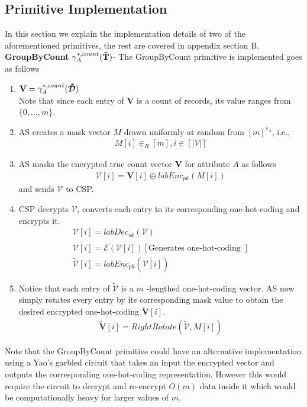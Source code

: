\subsection{Primitive Implementation}
In this section we explain the implementation details of two of the aforementioned \system primitives, the rest are covered in appendix section B.\\ \textbf{\textsf{GroupByCount }}$\gamma^{*,count}_A(\mathbf{\tilde{T}})$- The \textsf{GroupByCount} primitive is implemented  goes as follows   \begin{enumerate}[label=\alph*)]\item $\mathbf{V}=\gamma^{*,count}_{A}(\boldsymbol{\tilde{\mathcal{D}}})$ \\
 Note that since each entry of $\mathbf{V}$ is a count of records, its value ranges from $\{0,...,m\}$. \item \textsf{AS} creates a mask vector $M$ drawn uniformly at random from $[m]^{s_A}$, i.e.,  \begin{gather*} M[i] \in_R [m], i \in [|V|]\end{gather*} \item \textsf{AS} masks the encrypted true count vector $\mathbf{V}$ for attribute $A$ as follows \begin{gather*}\boldsymbol{\mathcal{V}}[i]= \mathbf{V}[i] \oplus labEnc_{pk}(M[i])\end{gather*} and sends $\boldsymbol{\mathcal{V}}$ to \textsf{CSP}.\item \textsf{CSP} decrypts $\boldsymbol{\mathcal{V}}$, converts each entry to its corresponding one-hot-coding and encrypts it. \begin{gather*}\mathcal{V}[i]=labDec_{sk}(\boldsymbol{\mathcal{V}})\\\tilde{\mathcal{V}[i]}=\mathcal{E}(\mathcal{V}[i])[\text{Generates one-hot-coding  }]\\\boldsymbol{\tilde{\mathcal{V}}}[i]=labEnc_{pk}(\tilde{\mathcal{V}[i]})\end{gather*}\item Notice that each entry of $\boldsymbol{\tilde{\mathcal{V}}}$ is a $m$ -lengthed one-hot-coding vector. \textsf{AS} now simply rotates every entry by its corresponding mask value to obtain the desired  encrypted one-hot-coding $\boldsymbol{\tilde{V}}[i]$. \begin{gather*}\boldsymbol{\tilde{V}}[i]=RightRotate(\boldsymbol{\tilde{\mathcal{V}}},M[i])\end{gather*}  \end{enumerate} Note that the \textsf{GroupByCount} primitive could have an alternative implementation using a Yao's garbled circuit that takes an input the encrypted vector and outputs the corresponding one-hot-coding representation. However this would require the circuit to decrypt and re-encrypt $O(m)$ data inside it which would be computationally heavy for larger values of $m$. 
